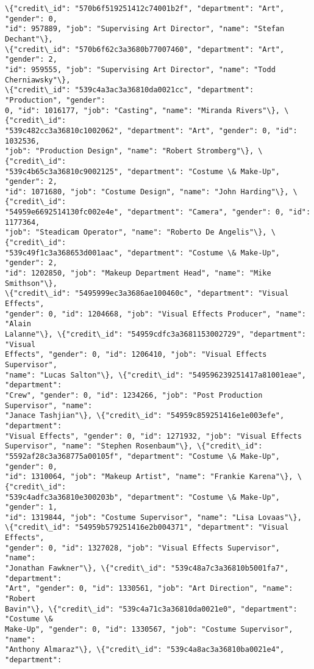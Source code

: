 \documentclass[11pt]{article}
\begin{document}
\begin{tcolorbox}[breakable, size=fbox, boxrule=.5pt, pad at break*=1mm, opacityfill=0]
\begin{Verbatim}[commandchars=\\\{\}]
\{"credit\_id": "570b6f519251412c74001b2f", "department": "Art", "gender": 0,
"id": 957889, "job": "Supervising Art Director", "name": "Stefan Dechant"\},
\{"credit\_id": "570b6f62c3a3680b77007460", "department": "Art", "gender": 2,
"id": 959555, "job": "Supervising Art Director", "name": "Todd Cherniawsky"\},
\{"credit\_id": "539c4a3ac3a36810da0021cc", "department": "Production", "gender":
0, "id": 1016177, "job": "Casting", "name": "Miranda Rivers"\}, \{"credit\_id":
"539c482cc3a36810c1002062", "department": "Art", "gender": 0, "id": 1032536,
"job": "Production Design", "name": "Robert Stromberg"\}, \{"credit\_id":
"539c4b65c3a36810c9002125", "department": "Costume \& Make-Up", "gender": 2,
"id": 1071680, "job": "Costume Design", "name": "John Harding"\}, \{"credit\_id":
"54959e6692514130fc002e4e", "department": "Camera", "gender": 0, "id": 1177364,
"job": "Steadicam Operator", "name": "Roberto De Angelis"\}, \{"credit\_id":
"539c49f1c3a368653d001aac", "department": "Costume \& Make-Up", "gender": 2,
"id": 1202850, "job": "Makeup Department Head", "name": "Mike Smithson"\},
\{"credit\_id": "5495999ec3a3686ae100460c", "department": "Visual Effects",
"gender": 0, "id": 1204668, "job": "Visual Effects Producer", "name": "Alain
Lalanne"\}, \{"credit\_id": "54959cdfc3a3681153002729", "department": "Visual
Effects", "gender": 0, "id": 1206410, "job": "Visual Effects Supervisor",
"name": "Lucas Salton"\}, \{"credit\_id": "549596239251417a81001eae", "department":
"Crew", "gender": 0, "id": 1234266, "job": "Post Production Supervisor", "name":
"Janace Tashjian"\}, \{"credit\_id": "54959c859251416e1e003efe", "department":
"Visual Effects", "gender": 0, "id": 1271932, "job": "Visual Effects
Supervisor", "name": "Stephen Rosenbaum"\}, \{"credit\_id":
"5592af28c3a368775a00105f", "department": "Costume \& Make-Up", "gender": 0,
"id": 1310064, "job": "Makeup Artist", "name": "Frankie Karena"\}, \{"credit\_id":
"539c4adfc3a36810e300203b", "department": "Costume \& Make-Up", "gender": 1,
"id": 1319844, "job": "Costume Supervisor", "name": "Lisa Lovaas"\},
\{"credit\_id": "54959b579251416e2b004371", "department": "Visual Effects",
"gender": 0, "id": 1327028, "job": "Visual Effects Supervisor", "name":
"Jonathan Fawkner"\}, \{"credit\_id": "539c48a7c3a36810b5001fa7", "department":
"Art", "gender": 0, "id": 1330561, "job": "Art Direction", "name": "Robert
Bavin"\}, \{"credit\_id": "539c4a71c3a36810da0021e0", "department": "Costume \&
Make-Up", "gender": 0, "id": 1330567, "job": "Costume Supervisor", "name":
"Anthony Almaraz"\}, \{"credit\_id": "539c4a8ac3a36810ba0021e4", "department":

\end{Verbatim}
\end{tcolorbox}
\end{document}
